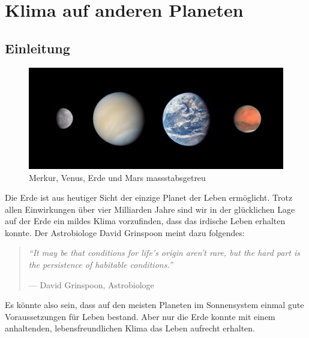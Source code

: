 %
%
%

\chapter{Klima auf anderen Planeten\label{chapter:planeten}}
\begin{refsection}

\section{Einleitung}

\begin{figure}
	\centering
	\includegraphics[width=0.7\linewidth, trim={0 2cm 0 2cm},clip]{planeten/Pictures/planets2.jpg}
	\caption{Merkur, Venus, Erde und Mars massstabsgetreu}
\end{figure}

Die Erde ist aus heutiger Sicht der einzige Planet der Leben ermöglicht. Trotz allen Einwirkungen über vier Milliarden Jahre sind wir in der glücklichen Lage auf der Erde ein mildes Klima vorzufinden, dass das irdische Leben erhalten konnte. 
Der Astrobiologe David Grinspoon meint dazu folgendes:
\begin{quote}
\textit{“It may be that conditions for life’s origin aren’t rare, but the hard part is the persistence of habitable conditions.”}
\begin{flushright}
--- David Grinspoon, Astrobiologe \cite{planeten:AstrobiologyMagazine} %
\end{flushright}
\end{quote}
Es könnte also sein, dass auf den meisten Planeten im Sonnensystem einmal gute Voraussetzungen für Leben bestand. Aber nur die Erde konnte mit einem anhaltenden, lebensfreundlichen Klima das Leben aufrecht erhalten.


\end{refsection}
